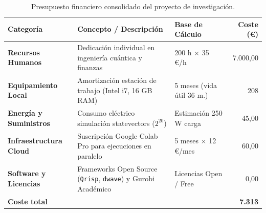 \begin{table}[htbp]
    \centering
    \small
    \caption{Presupuesto financiero consolidado del proyecto de investigación.}
    \label{tab:presupuesto_consolidado}
    \renewcommand{\arraystretch}{1.25}
    \begin{tabular}{p{3.2cm}p{6.2cm}p{3.3cm}r}
        \toprule
        \textbf{Categoría} & \textbf{Concepto / Descripción} & \textbf{Base de Cálculo} & \textbf{Coste (€)} \\
        \midrule
        \textbf{Recursos Humanos} & Dedicación individual en ingeniería cuántica y finanzas & 200 h $\times$ 35 €/h & 7.000,00 \\
        \textbf{Equipamiento Local} & Amortización estación de trabajo (Intel i7, 16 GB RAM) & 5 meses (vida útil 36 m.) & 208 \\
        \textbf{Energía y Suministros} & Consumo eléctrico simulación statevectors ($2^{20}$) & Estimación 250 W carga & 45,00 \\
        \textbf{Infraestructura Cloud} & Suscripción Google Colab Pro para ejecuciones en paralelo & 5 meses $\times$ 12 €/mes & 60,00 \\
        \textbf{Software y Licencias} & Frameworks Open Source (\texttt{Qrisp}, \texttt{dwave}) y Gurobi Académico & Licencias Open / Free & 0,00 \\
        \midrule
        \multicolumn{3}{l}{\textbf{Coste total}} & \textbf{7.313} \\
        \midrule
        \bottomrule
    \end{tabular}
\end{table}